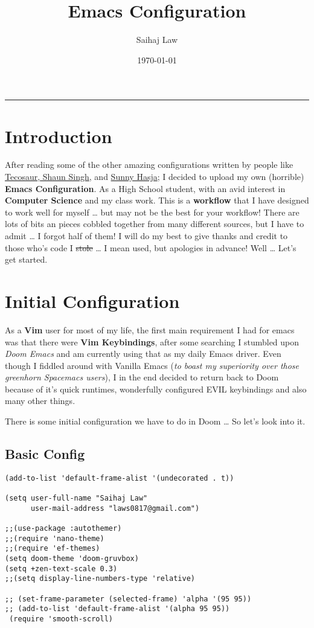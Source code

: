 \documentclass[11pt]{article}
\author{Saihaj Law}
\date{\today}
\title{Emacs Configuration}
\begin{document}
\maketitle
\tableofcontents


\noindent\rule{\textwidth}{0.5pt}
\section{Introduction}
\label{sec:org7f0544f}
After reading some of the other amazing configurations written by people like \href{https://tecosaur.github.io/emacs-config/config.html}{Tecosaur},\href{https://github.com/shaunsingh/nyoom.emacs}{ Shaun Singh}, and \href{https://github.com/sunnyhasija/Academic-Doom-Emacs-Config}{Sunny Hasja}; I decided to upload my own (horrible) \textbf{Emacs Configuration}. As a High School student, with an avid interest in \textbf{Computer Science} and my class work. This is a \textbf{workflow} that I have designed to work well for myself \ldots{} but may not be the best for your workflow! There are lots of bits an pieces cobbled together from many different sources, but I have to admit \ldots{} I forgot half of them!
I will do my best to give thanks and credit to those who's code I \sout{stole} \ldots{} I mean used, but apologies in advance!
Well \ldots{} Let's get started.
\section{Initial Configuration}
\label{sec:org2ba38e1}
As a \textbf{Vim} user for most of my life, the first main requirement I had for emacs was that there were \textbf{Vim Keybindings}, after some searching I stumbled upon \emph{Doom Emacs} and am currently using that as my daily Emacs driver. Even though I fiddled around with Vanilla Emacs (\emph{to boast my superiority over those greenhorn Spacemacs users}), I in the end decided to return back to Doom because of it's quick runtimes, wonderfully configured EVIL keybindings and also many other things.

There is some initial configuration we have to do in Doom \ldots{} So let's look into it.
\subsection{Basic Config}
\label{sec:org69986f3}
\begin{verbatim}
(add-to-list 'default-frame-alist '(undecorated . t))

(setq user-full-name "Saihaj Law"
      user-mail-address "laws0817@gmail.com")

;;(use-package :autothemer)
;;(require 'nano-theme)
;;(require 'ef-themes)
(setq doom-theme 'doom-gruvbox)
(setq +zen-text-scale 0.3)
;;(setq display-line-numbers-type 'relative)

;; (set-frame-parameter (selected-frame) 'alpha '(95 95))
;; (add-to-list 'default-frame-alist '(alpha 95 95))
 (require 'smooth-scroll)
\end{verbatim}
\end{document}
